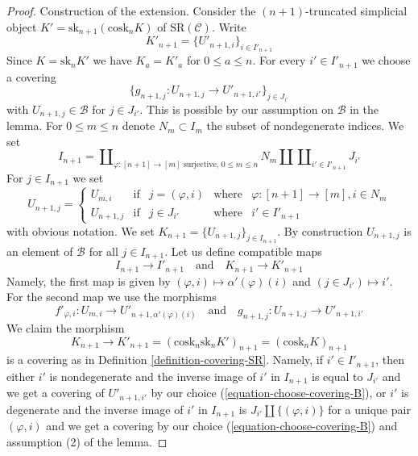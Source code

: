 \documentclass[10pt,a4paper]{amsart}
\theoremstyle{plain}
\theoremstyle{definition}
\theoremstyle{remark}
\numberwithin{equation}{subsection}
\begin{document}
\begin{proof}
\medskip\noindent
Construction of the extension. Consider the $(n + 1)$-truncated simplicial
object $K' = \text{sk}_{n + 1}(\text{cosk}_n K)$ of $\text{SR}(\mathcal{C})$.
Write
$$
K'_{n + 1} = \{U'_{n + 1, i}\}_{i \in I'_{n + 1}}
$$
Since $K = \text{sk}_n K'$ we have $K_a = K'_a$ for $0 \leq a \leq n$.
For every $i' \in I'_{n + 1}$ we choose a covering
\begin{equation}
\label{equation-choose-covering-B}
\{g_{n + 1, j} : U_{n + 1, j} \to U'_{n + 1, i'}\}_{j \in J_{i'}}
\end{equation}
with $U_{n + 1, j} \in \mathcal{B}$ for $j \in J_{i'}$.
This is possible by our assumption on $\mathcal{B}$ in the lemma.
For $0 \leq m \leq n$ denote $N_m \subset I_m$ the subset of
nondegenerate indices. We set
$$
I_{n + 1} =
\coprod\nolimits_{\varphi : [n + 1] \to [m]\text{ surjective, }0\leq m \leq n}
N_m \amalg
\coprod\nolimits_{i' \in I'_{n + 1}} J_{i'}
$$
For $j \in I_{n + 1}$ we set
$$
U_{n + 1, j} =
\left\{
\begin{matrix}
U_{m, i} & \text{if} &
j = (\varphi, i) & \text{where} & \varphi : [n + 1] \to [m], i \in N_m \\
U_{n + 1, j} & \text{if} &
j \in J_{i'} & \text{where} & i' \in I'_{n + 1}
\end{matrix}
\right.
$$
with obvious notation. We set $K_{n + 1} = \{U_{n + 1, j}\}_{j \in I_{n + 1}}$.
By construction $U_{n + 1, j}$ is an element
of $\mathcal{B}$ for all $j \in I_{n + 1}$. Let us define compatible
maps
$$
I_{n + 1} \to I'_{n + 1}
\quad\text{and}\quad
K_{n + 1} \to K'_{n + 1}
$$
Namely, the first map is given by
$(\varphi, i) \mapsto \alpha'(\varphi)(i)$ and
$(j \in J_{i'}) \mapsto i'$.
For the second map we use the morphisms
$$
f'_{\varphi, i} : U_{m, i} \to U'_{n + 1, \alpha'(\varphi)(i)}
\quad\text{and}\quad
g_{n + 1, j} : U_{n + 1, j} \to U'_{n + 1, i'}
$$
We claim the morphism
$$
K_{n + 1} \to K'_{n + 1} =
(\text{cosk}_n \text{sk}_n K')_{n + 1} =
(\text{cosk}_n K)_{n + 1}
$$
is a covering as in Definition \ref{definition-covering-SR}.
Namely, if $i' \in I'_{n + 1}$, then either $i'$ is nondegenerate
and the inverse image of $i'$ in $I_{n + 1}$ is equal to $J_{i'}$
and we get a covering of $U'_{n + 1, i'}$ by our choice
(\ref{equation-choose-covering-B}), or $i'$ is degenerate and
the inverse image of $i'$ in $I_{n + 1}$ is
$J_{i'} \amalg \{(\varphi, i)\}$ for a unique pair $(\varphi, i)$
and we get a covering by our choice (\ref{equation-choose-covering-B})
and assumption (2) of the lemma.


\end{proof}
\end{document}

